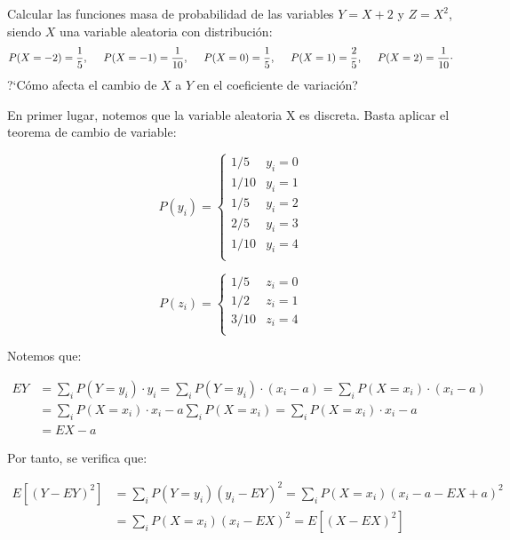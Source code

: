 \problem

Calcular las funciones masa de probabilidad de las
variables $Y = X + 2$ y $Z = X^{2}$, siendo $X$ una variable aleatoria  con
distribuci{\'o}n:
$$
P(X=-2)= \displaystyle\frac{1}{5}, \hskip 0.5cm P(X=-1)=
\displaystyle\frac{1}{10}, \hskip 0.5cm P(X=0)= \displaystyle\frac{1}{5},
\hskip 0.5cm P(X=1)= \displaystyle\frac{2}{5}, \hskip 0.5cm P(X=2)=
\displaystyle\frac{1}{10}\cdot
$$
?`C{\'o}mo afecta el cambio de $X$ a $Y$ en el coeficiente de variaci{\'o}n?

En primer lugar, notemos que la variable aleatoria X es discreta. Basta aplicar el teorema de cambio de variable:

\begin{equation*}
P(y_i) = \left\{ \begin{array}{lcc}
1/5   & y_i = 0 \\
1/10  & y_i = 1 \\
1/5   & y_i = 2 \\
2/5   & y_i = 3 \\
1/10  & y_i = 4 \\
\end{array}
\right.
\end{equation*}

\begin{equation*}
P(z_i) = \left\{ \begin{array}{lcc}
1/5   & z_i = 0 \\
1/2   & z_i = 1 \\
3/10  & z_i = 4 \\
\end{array}
\right.
\end{equation*}

Notemos que:

\begin{equation*}
\begin{split}
EY & = \sum_i P(Y=y_i)·y_i = \sum_i P(Y=y_i)·(x_i - a) = \sum_i P(X=x_i)·(x_i - a) \\
& = \sum_i P(X=x_i)·x_i - a\sum_i P(X=x_i) = \sum_i P(X=x_i)·x_i - a \\
& = EX - a
\end{split}
\end{equation*}

Por tanto, se verifica que: 

\begin{equation*}
\begin{split}
E[(Y-EY)^2] & = \sum_i P(Y=y_i)(y_i - EY)^2 = \sum_i P(X=x_i)(x_i - a - EX + a)^2 \\
& = \sum_i P(X=x_i)(x_i - EX)^2 = E[(X-EX)^2]
\end{split}
\end{equation*}

